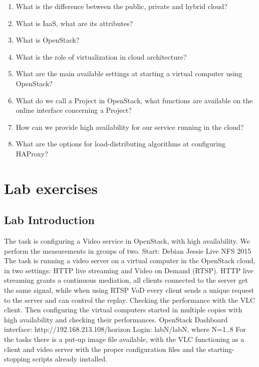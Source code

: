\documentclass[a4paper]{article}
\begin{document}
\begin{enumerate}
    \item What is the difference between the public, private and hybrid cloud?
    \item What is IaaS, what are its attributes?
    \item What is OpenStack?
    \item What is the role of virtualization in cloud architecture?
    \item What are the main available settings at starting a virtual computer using OpenStack?
    \item What do we call a Project in OpenStack, what functions are available on the online interface concerning a
          Project?
    \item How can we provide high availability for our service running in the cloud?
    \item What are the options for load-distributing algorithms at configuring HAProxy?
\end{enumerate}

\section{Lab exercises}

\subsection{Lab Introduction}

The task is configuring a Video service in OpenStack, with high availability. We perform the measurements in groups of
two. Start: Debian Jessie Live NFS 2015
The task is running a video server on a virtual computer in the OpenStack cloud, in two settings: HTTP live streaming
and Video on Demand (RTSP). HTTP live streaming grants a continuous mediation, all clients connected to the server get
the same signal, while when using RTSP VoD every client sends a unique request to the server and can control the
replay.
Checking the performance with the VLC client. Then configuring the virtual computers started in multiple copies with
high availability and checking their performances.
OpenStack Dashboard interface: http://192.168.213.108/horizon
Login: labN/labN, where N=1..8
For the tasks there is a put-up image file available, with the VLC functioning as a client and video server with the
proper configuration files and the starting-stopping scripts already installed.
\end{document}
